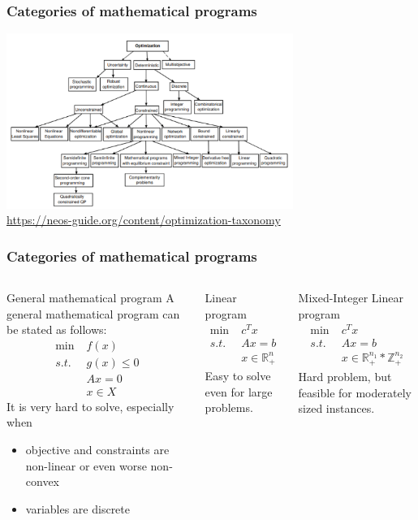 \begin{frame} \frametitle{Categories of mathematical programs}
\centering\includegraphics[width=0.7\textwidth]{categories.png}\\
\url{https://neos-guide.org/content/optimization-taxonomy}
\end{frame}

\begin{frame} \frametitle{Categories of mathematical programs}
\scriptsize
\begin{columns}
	\column{5cm}
	\begin{block}{\footnotesize General mathematical program}
		A general mathematical program can be stated as follows:
		\begin{align*}
			\min \; & f(x) \\
			s.t. \; & g(x) \leq 0 \\
			& Ax = 0 \\
			&x \in X
		\end{align*}
		It is very hard to solve, especially when
		\begin{itemize}
		\item objective and constraints are non-linear or even worse non-convex
		\item variables are discrete
		\end{itemize}
	\end{block}
	\column{8cm}
	\begin{block}{\footnotesize Linear program}
            \vspace{-1\baselineskip}
		\begin{align*}
		\min \; & c^Tx \\
		s.t. \; & Ax = b \\
		&x \in \mathbb{R}^n_+
		\end{align*}
		Easy to solve even for large problems.
	\end{block}
	\begin{block}{\footnotesize Mixed-Integer Linear program}
            \vspace{-1\baselineskip}
            \begin{align*}
		\min \; & c^Tx \\
		s.t. \; & Ax = b \\
		&x \in \mathbb{R}^{n_1}_+*\mathbb{Z}^{n_2}_+
		\end{align*}
		Hard problem, but feasible for moderately sized instances.
	\end{block}
\end{columns}
\end{frame}

